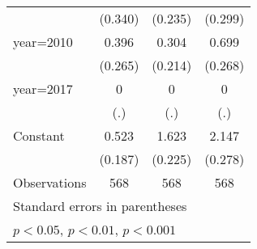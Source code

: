 {\begin{tabular}{l*{3}{c}}
                    &     (0.340)         &     (0.235)         &     (0.299)         \\
[1em]
year=2010           &       0.396         &       0.304         &       0.699\sym{*}  \\
                    &     (0.265)         &     (0.214)         &     (0.268)         \\
[1em]
year=2017           &           0         &           0         &           0         \\
                    &         (.)         &         (.)         &         (.)         \\
[1em]
Constant            &       0.523\sym{**} &       1.623\sym{***}&       2.147\sym{***}\\
                    &     (0.187)         &     (0.225)         &     (0.278)         \\
\hline
Observations        &         568         &         568         &         568         \\
\hline\hline
\multicolumn{4}{l}{\footnotesize Standard errors in parentheses}\\
\multicolumn{4}{l}{\footnotesize \sym{*} \(p<0.05\), \sym{**} \(p<0.01\), \sym{***} \(p<0.001\)}\\
\end{tabular}
}
